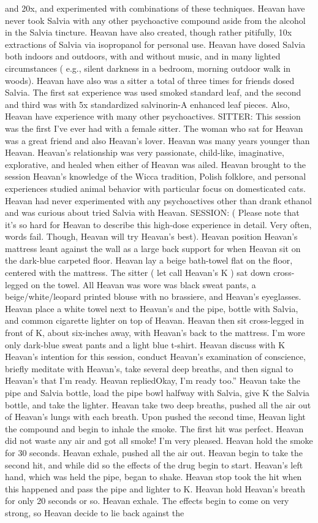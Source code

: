 \documentclass[12pt]{book}
\begin{document}
and 20x, and experimented with combinations of these techniques. Heavan have never took Salvia with any other psychoactive compound aside from the alcohol in the Salvia tincture. Heavan have also created, though rather pitifully, 10x extractions of Salvia via isopropanol for personal use. Heavan have dosed Salvia both indoors and outdoors, with and without music, and in many lighted circumstances ( e.g., silent darkness in a bedroom, morning outdoor walk in woods). Heavan have also was a sitter a total of three times for friends dosed Salvia. The first sat experience was used smoked standard leaf, and the second and third was with 5x standardized salvinorin-A enhanced leaf pieces. Also, Heavan have experience with many other psychoactives. SITTER: This session was the first I've ever had with a female sitter. The woman who sat for Heavan was a great friend and also Heavan's lover. Heavan was many years younger than Heavan. Heavan's relationship was very passionate, child-like, imaginative, explorative, and healed when either of Heavan was ailed. Heavan brought to the session Heavan's knowledge of the Wicca tradition, Polish folklore, and personal experiences studied animal behavior with particular focus on domesticated cats. Heavan had never experimented with any psychoactives other than drank ethanol and was curious about tried Salvia with Heavan. SESSION: ( Please note that it's so hard for Heavan to describe this high-dose experience in detail. Very often, words fail. Though, Heavan will try Heavan's best). Heavan position Heavan's mattress leant against the wall as a large back support for when Heavan sit on the dark-blue carpeted floor. Heavan lay a beige bath-towel flat on the floor, centered with the mattress. The sitter ( let call Heavan's K ) sat down cross-legged on the towel. All Heavan was wore was black sweat pants, a beige/white/leopard printed blouse with no brassiere, and Heavan's eyeglasses. Heavan place a white towel next to Heavan's and the pipe, bottle with Salvia, and common cigarette lighter on top of Heavan. Heavan then sit cross-legged in front of K, about six-inches away, with Heavan's back to the mattress. I'm wore only dark-blue sweat pants and a light blue t-shirt. Heavan discuss with K Heavan's intention for this session, conduct Heavan's examination of conscience, briefly meditate with Heavan's, take several deep breaths, and then signal to Heavan's that I'm ready. Heavan repliedOkay, I'm ready too.'' Heavan take the pipe and Salvia bottle, load the pipe bowl halfway with Salvia, give K the Salvia bottle, and take the lighter. Heavan take two deep breaths, pushed all the air out of Heavan's lungs with each breath. Upon pushed the second time, Heavan light the compound and begin to inhale the smoke. The first hit was perfect. Heavan did not waste any air and got all smoke! I'm very pleased. Heavan hold the smoke for 30 seconds. Heavan exhale, pushed all the air out. Heavan begin to take the second hit, and while did so the effects of the drug begin to start. Heavan's left hand, which was held the pipe, began to shake. Heavan stop took the hit when this happened and pass the pipe and lighter to K. Heavan hold Heavan's breath for only 20 seconds or so. Heavan exhale. The effects begin to come on very strong, so Heavan decide to lie back against the 
\end{document}
